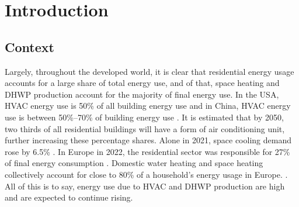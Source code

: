\chapter{Introduction}\label{ch:intro}



\section{Context}\label{sec:context}

Largely, throughout the developed world, it is clear that residential energy usage accounts for a large share of total energy use, and of that, space heating and \ac{DHWP} production account for the majority of final energy use. In the USA, \ac{HVAC} energy use is 50\% of all building energy use and in China, \ac{HVAC} energy use is between 50\%--70\% of building energy use \cite{ieaorg_2018}. It is estimated that by 2050, two thirds of all residential buildings will have a form of air conditioning unit, further increasing these percentage shares. Alone in 2021, space cooling demand rose by 6.5\% \cite{ieaorg_2022}. 
In Europe in 2022, the  residential sector was responsible for 27\% of final energy consumption \cite{eurostat_final_2018}. Domestic water heating and space heating collectively account for close to 80\% of a household's energy usage in Europe. \cite{eurostat_energy_2020}.
All of this is to say, energy use due to \ac{HVAC} and \ac{DHWP} production are high and are expected to continue rising. 

